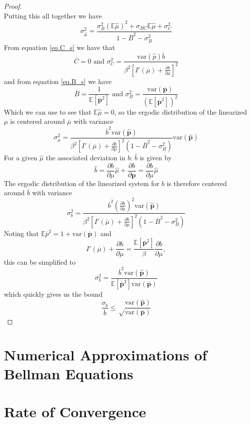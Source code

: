 \documentclass[12pt]{article}
\newcommand{\tjs}[1]{\textcolor{red}{$^{\textrm{tjs}}${#1}}}
\newcommand{\EE}{\mathbb E}
\newcommand{\var}{\text{var}}
\newcommand{\barB}{{\overline B}}
\newcommand{\barC}{{\overline C}}
\newcommand{\pbar}{{\overline p}}
\newcommand{\bbar}{{\overline b}}
\newcommand{\mubar}{{\overline \mu}}
\begin{document}
\begin{appendix}
\begin{proof}
\[\]Putting this all together we have
\begin{equation}
	\sigma_{\hat\mu}^2 = \frac{\sigma_B^2(\EE\hat\mu)^2 + \sigma_{BC}\EE\hat\mu + \sigma_C^2}{1-\barB^2-\sigma_B^2}
\end{equation}  From equation \eqref{eq.C_s} we have that 
\begin{equation}
	\barC = 0 \text{  and  } \sigma^2_C = \frac{\var(\hat p)\overline b}{\beta^2\left[I'(\mubar)+\frac{\partial b}{\partial \mu}\right]^2}
\end{equation} and from equation \eqref{eq.B_s}  we have
\begin{equation}
	\barB  = \frac{1}{\EE[\bm \pbar^2]}\text{  and  }\sigma_B^2 = \frac{\var(\bm\pbar)}{(\EE[\bm\pbar^2])^2}
\end{equation}  Which we can use to see that $\EE\hat\mu = 0$, so the ergodic distribution of the linearized $\mu$ is centered around $\mubar$ with variance
\begin{equation}
\sigma_{\mu}^2 = \frac{\bbar^2\var(\hat {\bm p})}{\beta^2\left[I'(\mubar)+\frac{\partial b}{\partial\mu}\right]^2\left(1-\barB^2-\sigma_B^2\right)}\var(\bm{\hat p})
\end{equation}  For a given $\hat \mu$ the associated deviation in $b$: $\hat b$ is given by
\[
	\hat b = \frac{\partial b}{\partial \mu}\hat \mu + \frac{\partial b}{\partial\bm p} = \frac{\partial b}{\partial \mu}\hat \mu 
\]  The ergodic distribution of the linearized system for $b$ is therefore centered around $\bbar$ with variance
\[
	\sigma_b^2 = \frac{\bbar^2\left(\frac{\partial b}{\partial\mu}\right)^2\var(\hat {\bm p})}{\beta^2\left[I'(\mubar)+\frac{\partial b}{\partial\mu}\right]^2\left(1-\barB^2-\sigma_B^2\right)}
\] Noting that $\EE\pbar^2 = 1+\var(\bm\pbar)$ and 
\[
	I'(\mubar)+\frac{\partial b}{\partial \mu} = \frac{\EE[\bm \pbar^2]}{\beta}\frac{\partial b}{\partial\mu},
\]this can be simplified to 
\begin{equation}
	\sigma^2_b = \frac{\bbar^2\var(\hat {\bm p})}{\EE[\bm \pbar^2]\var(\bm\pbar)}
\end{equation} which quickly gives us the bound
\begin{equation}
	\frac{\sigma_b}{\bbar} \leq \sqrt\frac{\var(\hat {\bm p})}{\var(\bm\pbar)}
\end{equation}
\end{proof}
\section{Numerical Approximations of Bellman Equations\label{sec:app_numerical}}

 \section{Rate of Convergence\label{sec:app_convergence}}

\end{appendix}

%



\end{document}
